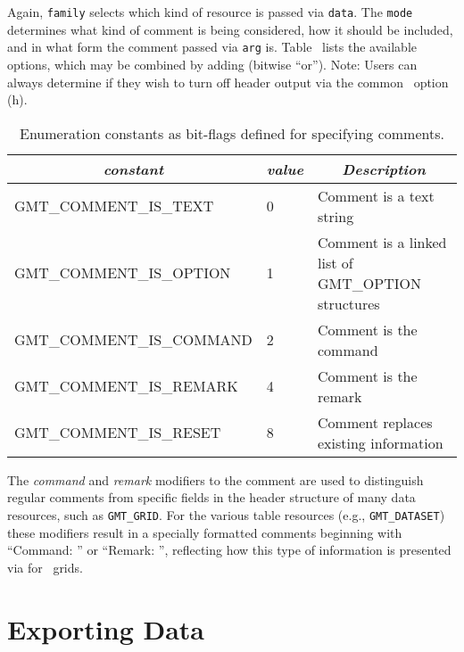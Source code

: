 \documentclass[11pt]{report}
\begin{document}
Again, \texttt{family} selects which kind of resource is passed via \texttt{data}. The \texttt{mode}
determines what kind of comment is being considered, how it should be included, and in what form the comment
passed via \texttt{arg} is.  Table~\cite{tbl:comments} lists the available options, which may be combined
by adding (bitwise ``or'').  Note: Users can always
determine if they wish to turn off header output via the common \GMT\ option \Opt(h).

\begin{table}[h]
\small
\centering
\begin{tabular}{|l|l|l|} \hline
\multicolumn{1}{|c|}{\emph{constant}} & \multicolumn{1}{c|}{\emph{value}}  & \multicolumn{1}{c|}{\emph{Description}} \\ \hline
GMT\_COMMENT\_IS\_TEXT		&      0	& Comment is a text string \\ \hline
GMT\_COMMENT\_IS\_OPTION	&      1	& Comment is a linked list of GMT_OPTION structures \\ \hline
GMT\_COMMENT\_IS\_COMMAND	&      2	& Comment is the command \\ \hline
GMT\_COMMENT\_IS\_REMARK	&      4	& Comment is the remark \\ \hline
GMT\_COMMENT\_IS\_RESET		&      8	& Comment replaces existing information \\ \hline
\end{tabular}
\caption{Enumeration constants as bit-flags defined for specifying comments.}
\label{tbl:comments}
\end{table}
The \emph{command }and \emph{remark} modifiers to the comment are used to distinguish regular comments from specific fields in the
header structure of many data resources, such as \texttt{GMT\_GRID}.  For the various table resources (e.g., \texttt{GMT\_DATASET})
these modifiers result in a specially formatted comments beginning with ``Command: '' or ``Remark: '', reflecting how this
type of information is presented via  for \GMT\ grids.

\section{Exporting Data}
\end{document}
